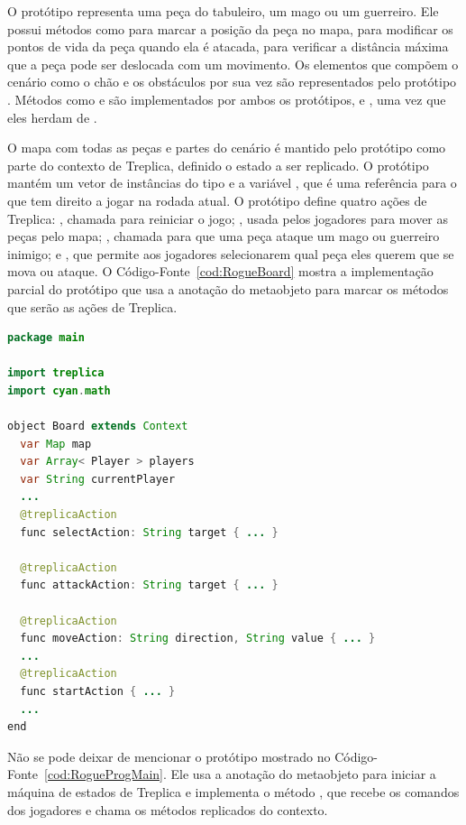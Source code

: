 O protótipo  representa uma peça do tabuleiro, um mago ou um guerreiro. Ele possui métodos como  para marcar a posição da peça no mapa,  para modificar os pontos de vida da peça quando ela é atacada,  para verificar a distância máxima que a peça pode ser deslocada com um movimento. Os elementos que compõem o cenário como o chão e os obstáculos por sua vez são representados pelo protótipo . Métodos como  e  são implementados por ambos os protótipos,  e , uma vez que eles herdam de .

O mapa com todas as peças e partes do cenário é mantido pelo protótipo  como parte do contexto de Treplica, definido o estado a ser replicado. O protótipo  mantém um vetor de instâncias do tipo  e a variável , que é uma referência para o  que tem direito a jogar na rodada atual. O protótipo  define quatro ações de Treplica: , chamada para reiniciar o jogo; , usada pelos jogadores para mover as peças pelo mapa; , chamada para que uma peça ataque um mago ou guerreiro inimigo; e , que permite aos jogadores selecionarem qual peça eles querem que se mova ou ataque. O Código-Fonte~\ref{cod:RogueBoard} mostra a implementação parcial do protótipo  que usa a anotação do metaobjeto  para marcar os métodos que serão as ações de Treplica.

\begin{lstlisting}[language=Java, caption={Protótipo \textbf{Board} que integra a aplicação}, label={cod:RogueBoard}]
package main

import treplica
import cyan.math

object Board extends Context
  var Map map
  var Array< Player > players
  var String currentPlayer
  ...
  @treplicaAction
  func selectAction: String target { ... }

  @treplicaAction
  func attackAction: String target { ... }

  @treplicaAction
  func moveAction: String direction, String value { ... }
  ...
  @treplicaAction
  func startAction { ... }
  ...
end
\end{lstlisting}

Não se pode deixar de mencionar o protótipo  mostrado no Código-Fonte~\ref{cod:RogueProgMain}. Ele usa a anotação do metaobjeto  para iniciar a máquina de estados de Treplica e implementa o método , que recebe os comandos dos jogadores e chama os métodos replicados do contexto. 


